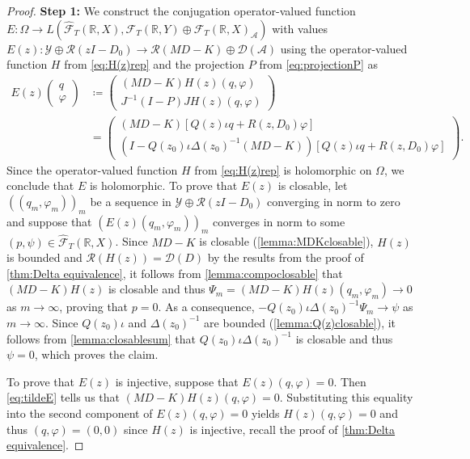 \documentclass[english]{myarticle}
\begin{document}
\begin{sloppypar}
\begin{proof}
\textbf{Step 1:} We construct the conjugation operator-valued function $E : \Omega \to L(\hat{\mathcal{F}}_T(\mathbb{R},X),\mathcal{F}_T(\mathbb{R},Y) \oplus \mathcal{F}_T(\mathbb{R},X)_{\mathcal{A}})$ with values $E(z) : \mathcal{Y} \oplus \mathcal{R}(zI-D_0) \to \mathcal{R}(MD-K) \oplus \mathcal{D}(\mathcal{A})$ using the operator-valued function $H$ from \eqref{eq:H(z)rep} and the projection $P$ from \eqref{eq:projectionP} as
\begin{equation} 
\begin{aligned}
\label{eq:tildeE}
    E(z) 
    \begin{pmatrix}
        q \\
        \varphi
    \end{pmatrix}
    &\coloneqq
 \begin{pmatrix}
        (MD-K) H(z)(q, \varphi) \\
        J^{-1}(I-P)J H(z)(q, \varphi)
    \end{pmatrix} \\
    &=
    \begin{pmatrix}
        (MD - K)[Q(z)\iota q + R(z,D_0) \varphi] \\
        (I - Q(z_0)\iota\Delta(z_0)^{-1}(MD-K))[Q(z)\iota q + R(z,D_0) \varphi]
    \end{pmatrix}.
    \end{aligned}
\end{equation}
Since the operator-valued function $H$ from \eqref{eq:H(z)rep} is holomorphic on $\Omega$, we conclude that $E$ is holomorphic. To prove that $E(z)$ is closable, 
let $((q_m,\varphi_m))_m$ be a sequence in $\mathcal{Y} \oplus \mathcal{R}(zI-D_0)$ converging in norm to zero and suppose that $(E(z)(q_m,\varphi_m))_m$ converges in norm to some $(p,\psi) \in \hat{\mathcal{F}}_T(\mathbb{R},X)$. Since $MD-K$ is closable (\cref{lemma:MDKclosable}), $H(z)$ is bounded and $\mathcal{R}(H(z)) = \mathcal{D}(D)$ by the results from the proof of \cref{thm:Delta equivalence}, it follows from \cref{lemma:compoclosable} that $(MD-K)H(z)$ is closable and thus $\Psi_m = (MD-K)H(z) (q_m,\varphi_m) \to 0$ as $m \to \infty$, proving that $p = 0$. As a consequence, $-Q(z_0)\iota \Delta(z_0)^{-1} \Psi_m \to \psi$ as $m \to \infty$. Since $Q(z_0) \iota$ and $\Delta(z_0)^{-1}$ are bounded (\cref{lemma:Q(z)closable}), it follows from \cref{lemma:closablesum} that $Q(z_0) \iota \Delta(z_0)^{-1}$ is closable and thus $\psi = 0$, which proves the claim. 

To prove that $E(z)$ is injective, suppose that $E(z)(q,\varphi) = 0$. Then \eqref{eq:tildeE} tells us that $(MD-K)H(z)(q,\varphi) = 0$. Substituting this equality into the second component of $E(z)(q,\varphi) = 0$ yields $H(z)(q,\varphi) = 0$ and thus $(q,\varphi) = (0,0)$ since $H(z)$ is injective, recall the proof of \cref{thm:Delta equivalence}. 


\end{proof}
\end{sloppypar}
\end{document}
